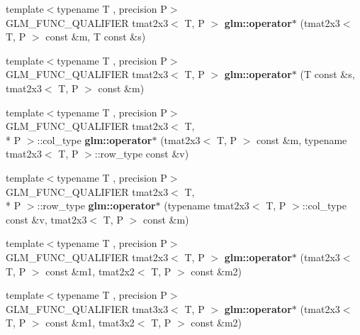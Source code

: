 \begin{DoxyCompactItemize}
\item 
\hypertarget{namespaceglm_a1654f3586768d3ac012abdaf9a13c67f}{{\footnotesize template$<$typename T , precision P$>$ }\\G\-L\-M\-\_\-\-F\-U\-N\-C\-\_\-\-Q\-U\-A\-L\-I\-F\-I\-E\-R tmat2x3$<$ T, P $>$ {\bfseries glm\-::operator$\ast$} (tmat2x3$<$ T, P $>$ const \&m, T const \&s)}\label{namespaceglm_a1654f3586768d3ac012abdaf9a13c67f}

\item 
\hypertarget{namespaceglm_a4b97857dfd756b040b6deaaf24d7a63e}{{\footnotesize template$<$typename T , precision P$>$ }\\G\-L\-M\-\_\-\-F\-U\-N\-C\-\_\-\-Q\-U\-A\-L\-I\-F\-I\-E\-R tmat2x3$<$ T, P $>$ {\bfseries glm\-::operator$\ast$} (T const \&s, tmat2x3$<$ T, P $>$ const \&m)}\label{namespaceglm_a4b97857dfd756b040b6deaaf24d7a63e}

\item 
\hypertarget{namespaceglm_a949617aa8e8cff34aabb9149c9f456af}{{\footnotesize template$<$typename T , precision P$>$ }\\G\-L\-M\-\_\-\-F\-U\-N\-C\-\_\-\-Q\-U\-A\-L\-I\-F\-I\-E\-R tmat2x3$<$ T, \\*
P $>$\-::col\-\_\-type {\bfseries glm\-::operator$\ast$} (tmat2x3$<$ T, P $>$ const \&m, typename tmat2x3$<$ T, P $>$\-::row\-\_\-type const \&v)}\label{namespaceglm_a949617aa8e8cff34aabb9149c9f456af}

\item 
\hypertarget{namespaceglm_a5286d44cdb2c44dafa52fae5b84655ea}{{\footnotesize template$<$typename T , precision P$>$ }\\G\-L\-M\-\_\-\-F\-U\-N\-C\-\_\-\-Q\-U\-A\-L\-I\-F\-I\-E\-R tmat2x3$<$ T, \\*
P $>$\-::row\-\_\-type {\bfseries glm\-::operator$\ast$} (typename tmat2x3$<$ T, P $>$\-::col\-\_\-type const \&v, tmat2x3$<$ T, P $>$ const \&m)}\label{namespaceglm_a5286d44cdb2c44dafa52fae5b84655ea}

\item 
\hypertarget{namespaceglm_abf88e6226fe06c50efc4632326d0b5d6}{{\footnotesize template$<$typename T , precision P$>$ }\\G\-L\-M\-\_\-\-F\-U\-N\-C\-\_\-\-Q\-U\-A\-L\-I\-F\-I\-E\-R tmat2x3$<$ T, P $>$ {\bfseries glm\-::operator$\ast$} (tmat2x3$<$ T, P $>$ const \&m1, tmat2x2$<$ T, P $>$ const \&m2)}\label{namespaceglm_abf88e6226fe06c50efc4632326d0b5d6}

\item 
\hypertarget{namespaceglm_ad6e371f1de55e754fdde27898d29c377}{{\footnotesize template$<$typename T , precision P$>$ }\\G\-L\-M\-\_\-\-F\-U\-N\-C\-\_\-\-Q\-U\-A\-L\-I\-F\-I\-E\-R tmat3x3$<$ T, P $>$ {\bfseries glm\-::operator$\ast$} (tmat2x3$<$ T, P $>$ const \&m1, tmat3x2$<$ T, P $>$ const \&m2)}\label{namespaceglm_ad6e371f1de55e754fdde27898d29c377}


\end{DoxyCompactItemize}
